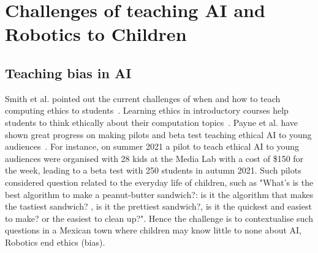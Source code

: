 \documentclass[sigconf]{acmart}
\begin{document}
%
%

\section{Challenges of teaching AI and Robotics to Children}
\subsection{Teaching bias in AI}
Smith et al. pointed out the current challenges of when and how to teach computing ethics to students~\cite{smith2022incorporating}.
Learning ethics in introductory courses help students to think ethically about their computation topics~\cite{fiesler2021}.
Payne et al. have shown great progress on making pilots and beta test teaching ethical AI to young audiences~\cite{payne2020}.
For instance, on summer 2021 a pilot to teach ethical AI to young audiences were organised with 28 kids at the Media Lab with a cost of \$150 for the week, leading to a beta test with 250 students in autumn 2021. 
Such pilots considered question related to the everyday life of children, such as "What's is the best algorithm to make a peanut-butter sandwich?: is it the algorithm that makes the tastiest sandwich? , is it the prettiest sandwich?, is it the quickest and easiest to make? or the easiest to clean up?". 
Hence the challenge is to contextualise such questions in a Mexican town where children may know little to none about AI, Robotics end ethics (bias).
\end{document}
